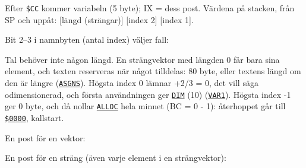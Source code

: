 \begin{Listing}
\Gap
{}
\begin{Note}\par\noindent Efter \texttt{\$CC} kommer variabeln (5 byte); IX = dess post. Värdena på stacken, från SP och uppåt: [längd (strängar)] [index 2] [index 1].\par
\par\noindent Bit 2–3 i namnbyten (antal index) väljer fall:\par
\begin{Verb}
\end{Verb}
\par\noindent Tal behöver inte någon längd. En strängvektor med längden 0 får bara sina element, och texten reserveras när något tilldelas: 80 byte, eller textens längd om den är längre (\hyperlink{l:ASGNS}{\texttt{ASGNS}}). Högsta index 0 lämnar +2/3 = 0, det vill säga odimensionerad, och första användningen ger \hyperlink{l:DIM}{\texttt{DIM}} (10) (\hyperlink{l:VAR1}{\texttt{VAR1}}). Högsta index \mbox{-}1 ger 0 byte, och då nollar \hyperlink{l:ALLOC}{\texttt{ALLOC}} hela minnet (BC = 0 - 1): återhoppet går till \hyperlink{a:0000}{\texttt{\$0000}}, kallstart.\par
\par\noindent En post för en vektor:\par
\begin{Verb}
\end{Verb}
\par\noindent En post för en sträng (även varje element i en strängvektor):\par
\begin{Verb}
\end{Verb}\end{Note}

\end{Listing}
